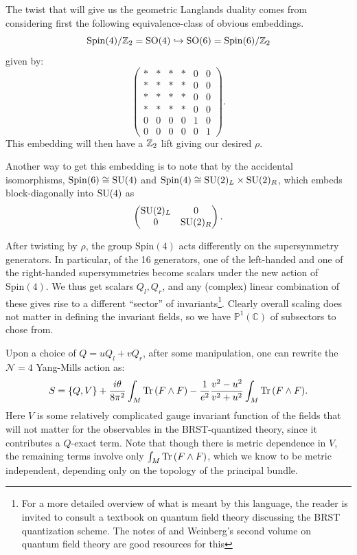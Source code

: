 	The twist that will give us the geometric Langlands duality comes from considering first the following equivalence-class of obvious embeddings.
	$$\mathrm{Spin}(4)/\mathbb{Z}_2 = \mathrm{SO}(4) \hookrightarrow \mathrm{SO}(6) = \mathrm{Spin}(6)/\mathbb{Z}_2$$
	given by:
	\[
		\begin{pmatrix}
			* & * & * & * & 0 & 0 \\
			* & * & * & * & 0 & 0 \\
			* & * & * & * & 0 & 0 \\
			* & * & * & * & 0 & 0 \\
			0 & 0 & 0 & 0 & 1 & 0 \\
			0 & 0 & 0 & 0 & 0 & 1
		\end{pmatrix}.
	\]
	This embedding will then have a $\mathbb{Z}_2$ lift giving our desired $\rho$. 
	
	Another way to get this embedding is to note that by the accidental isomorphisms, $\mathrm{Spin}(6) \cong \mathrm{SU}(4)$ and $\mathrm{Spin}(4) \cong \mathrm{SU}(2)_L \times \mathrm{SU}(2)_R$, which embeds block-diagonally into $\mathrm{SU}(4)$ as
	\[
		\begin{pmatrix}
			\mathrm{SU}(2)_L & 0 \\
			0 & \mathrm{SU}(2)_R
		\end{pmatrix}.
	\]
	
	After twisting by $\rho$, the group $\mathrm{Spin}(4)$ acts differently on the supersymmetry generators. In particular, of the 16 generators, one of the left-handed and one of the right-handed supersymmetries become scalars under the new action of $\mathrm{Spin}(4)$. We thus get scalars $Q_l, Q_r$, and any (complex) linear combination of these gives rise to a different ``sector'' of invariants\footnote{For a more detailed overview of what is meant by this language, the reader is invited to consult a textbook on quantum field theory discussing the BRST quantization scheme. The notes of \cite{van2005aspects} and Weinberg's second volume on quantum field theory \cite{weinberg1995quantum} are good resources for this}. Clearly overall scaling does not matter in defining the invariant fields, so we have $\mathbb P^1 (\mathbb C)$ of subsectors to chose from.
	
	Upon a choice of $Q = u Q_l + v Q_r$, after some manipulation, one can rewrite the $\mathcal N=4$ Yang-Mills action as:
	\begin{equation}
		S = \{ Q , V \} + \frac{i \theta}{8\pi^2} \int_M \mathrm{Tr}\,(F \wedge F) - \frac{1}{e^2} \frac{v^2-u^2}{v^2+u^2} \int_M \mathrm{Tr}\, (F \wedge F).
	\end{equation}
	Here $V$ is some relatively complicated gauge invariant function of the fields that will not matter for the observables in the BRST-quantized theory, since it contributes a $Q$-exact term. Note that though there is metric dependence in $V$, the remaining terms involve only $\int_M \mathrm{Tr}\, (F \wedge F)$, which we know to be metric independent, depending only on the topology of the principal bundle. 
	

